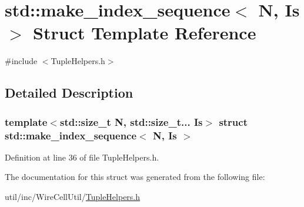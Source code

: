 \hypertarget{structstd_1_1make__index__sequence}{}\section{std\+:\+:make\+\_\+index\+\_\+sequence$<$ N, Is $>$ Struct Template Reference}
\label{structstd_1_1make__index__sequence}


{\ttfamily \#include $<$Tuple\+Helpers.\+h$>$}



\subsection{Detailed Description}
\subsubsection*{template$<$std\+::size\+\_\+t N, std\+::size\+\_\+t... Is$>$\newline
struct std\+::make\+\_\+index\+\_\+sequence$<$ N, Is $>$}



Definition at line 36 of file Tuple\+Helpers.\+h.



The documentation for this struct was generated from the following file\+:\begin{DoxyCompactItemize}
\item 
util/inc/\+Wire\+Cell\+Util/\hyperlink{_tuple_helpers_8h}{Tuple\+Helpers.\+h}\end{DoxyCompactItemize}
